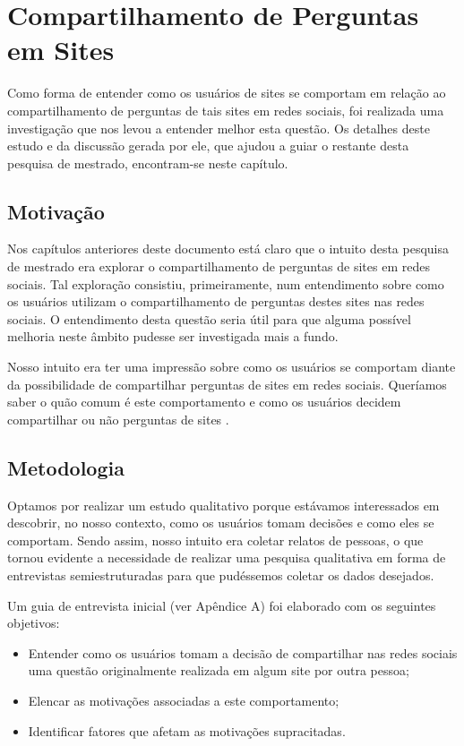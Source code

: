 \chapter{Compartilhamento de Perguntas em Sites \qa}
Como forma de entender como os usuários de sites \qa se comportam em relação ao compartilhamento de perguntas de tais sites em redes sociais, foi realizada uma investigação que nos levou a entender melhor esta questão. Os detalhes deste estudo e da discussão gerada por ele, que ajudou a guiar o restante desta pesquisa de mestrado, encontram-se neste capítulo.
\section{Motivação}
Nos capítulos anteriores deste documento está claro que o intuito desta pesquisa de mestrado era explorar o compartilhamento de perguntas de sites \qa em redes sociais. Tal exploração consistiu, primeiramente, num entendimento sobre como os usuários utilizam o compartilhamento de perguntas destes sites nas redes sociais. O entendimento desta questão seria útil para que alguma possível melhoria neste âmbito pudesse ser investigada mais a fundo.

Nosso intuito era ter uma impressão sobre como os usuários se comportam diante da possibilidade de compartilhar perguntas de sites \qa em redes sociais. Queríamos saber o quão comum é este comportamento e como os usuários decidem compartilhar ou não perguntas de sites \qanospace.

\section{Metodologia}
Optamos por realizar um estudo qualitativo porque estávamos interessados em descobrir, no nosso contexto, como os usuários tomam decisões e como eles se comportam. Sendo assim, nosso intuito era coletar relatos de pessoas, o que tornou evidente a necessidade de realizar uma pesquisa qualitativa em forma de entrevistas semiestruturadas \cite{hennink2010qualitative} para que pudéssemos coletar os dados desejados. 

Um guia de entrevista inicial (ver Apêndice A) foi elaborado com os seguintes objetivos:
\begin{itemize}
\item Entender como os usuários tomam a decisão de compartilhar nas redes sociais uma questão originalmente realizada em algum site \qa por outra pessoa;
\item Elencar as motivações associadas a este comportamento;
\item Identificar fatores que afetam as motivações supracitadas.
\end{itemize}

